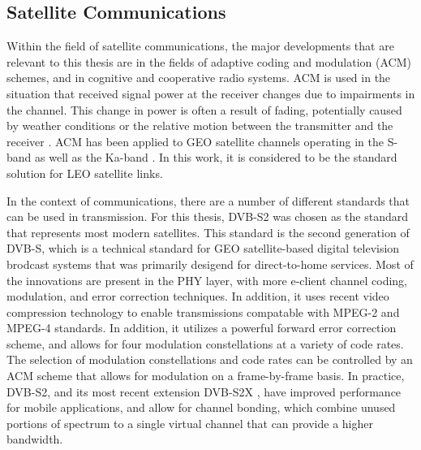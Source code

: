 \subsection{Satellite Communications}
\par Within the field of satellite communications, the major developments that are relevant to this thesis are in the fields of adaptive coding and modulation (ACM) schemes, and in cognitive and cooperative radio systems. ACM is used in the situation that received signal power at the receiver changes due to impairments in the channel. This change in power is often a result of fading, potentially caused by weather conditions or the relative motion between the transmitter and the receiver \cite{paulo_cite_17}. ACM has been applied to GEO satellite channels operating in the S-band \cite{paulo_cite_18} as well as the Ka-band \cite{paulo_cite_19}. In this work, it is considered to be the standard solution for LEO satellite links.  
\par In the context of communications, there are a number of different standards that can be used in transmission. For this thesis, DVB-S2 \cite{paulo_cite_21} was chosen as the standard that represents most modern satellites. This standard is the second generation of DVB-S, which is a technical standard for GEO satellite-based digital television brodcast systems that was primarily desigend for direct-to-home services. Most of the innovations are present in the PHY layer, with more e-client channel coding, modulation, and error correction techniques. In addition, it uses recent video compression technology to enable transmissions compatable with MPEG-2 and MPEG-4 standards. In addition, it utilizes a powerful forward error correction scheme, and allows for four modulation constellations at a variety of code rates. The selection of modulation constellations and code rates can be controlled by an ACM scheme that allows for modulation on a frame-by-frame basis. In practice, DVB-S2, and its most recent extension DVB-S2X \cite{paulo_cite_22}, have improved performance for mobile applications, and allow for channel bonding, which combine unused portions of spectrum to a single virtual channel that can provide a higher bandwidth.
